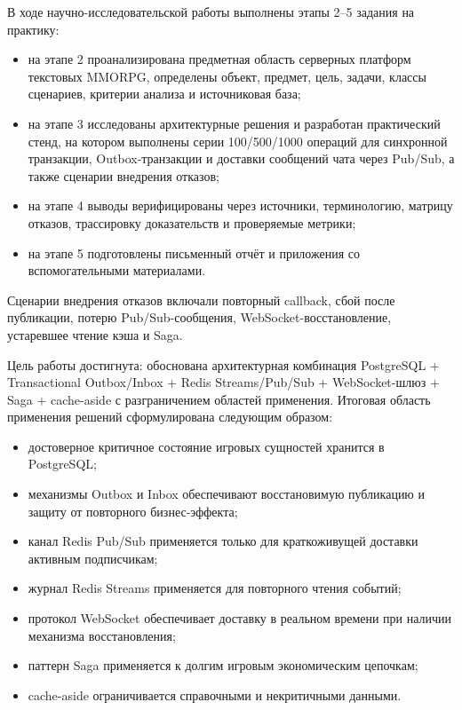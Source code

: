 \documentclass[a4paper,14pt]{extarticle}
\numberwithin{figure}{section}
\numberwithin{table}{section}
\begin{document}
В ходе научно-исследовательской работы выполнены этапы 2--5 задания на практику:
\begin{itemize}
\item на этапе 2 проанализирована предметная область серверных платформ текстовых MMORPG, определены объект, предмет, цель, задачи, классы сценариев, критерии анализа и источниковая база;
\item на этапе 3 исследованы архитектурные решения и разработан практический стенд, на котором выполнены серии 100/500/1000 операций для синхронной транзакции, Outbox-транзакции и доставки сообщений чата через Pub/Sub, а также сценарии внедрения отказов;
\item на этапе 4 выводы верифицированы через источники, терминологию, матрицу отказов, трассировку доказательств и проверяемые метрики;
\item на этапе 5 подготовлены письменный отчёт и приложения со вспомогательными материалами.
\end{itemize}
Сценарии внедрения отказов включали повторный callback, сбой после публикации, потерю Pub/Sub-сообщения, WebSocket-восстановление, устаревшее чтение кэша и Saga.

Цель работы достигнута: обоснована архитектурная комбинация PostgreSQL + Transactional Outbox/Inbox + Redis Streams/Pub/Sub + WebSocket-шлюз + Saga + cache-aside с разграничением областей применения. Итоговая область применения решений сформулирована следующим образом:
\begin{itemize}
\item достоверное критичное состояние игровых сущностей хранится в PostgreSQL;
\item механизмы Outbox и Inbox обеспечивают восстановимую публикацию и защиту от повторного бизнес-эффекта;
\item канал Redis Pub/Sub применяется только для краткоживущей доставки активным подписчикам;
\item журнал Redis Streams применяется для повторного чтения событий;
\item протокол WebSocket обеспечивает доставку в реальном времени при наличии механизма восстановления;
\item паттерн Saga применяется к долгим игровым экономическим цепочкам;
\item cache-aside ограничивается справочными и некритичными данными.
\end{itemize}
\end{document}
